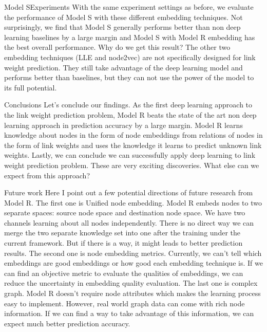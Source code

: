 \documentclass{beamer}
\begin{document}
\begin{frame}{Model S}{Experiments}
With the same experiment settings as before, we evaluate the performance of Model S with these different embedding techniques. Not surprisingly, we find that Model S generally performs better than non deep learning baselines by a large margin and Model S with Model R embedding has the best overall performance. Why do we get this result? The other two embedding techniques (LLE and node2vec) are not specifically designed for link weight prediction. They still take advantage of the deep learning model and performs better than baselines, but they can not use the power of the model to its full potential.
\end{frame}

\begin{frame}{Conclusions}
Let's conclude our findings. As the first deep learning approach to the link weight prediction problem, Model R beats the state of the art non deep learning approach in prediction accuracy by a large margin. Model R learns knowledge about nodes in the form of node embeddings from relations of nodes in the form of link weights and uses the knowledge it learns to predict unknown link weights. Lastly, we can conclude we can successfully apply deep learning to link weight prediction problem. These are very exciting discoveries. What else can we expect from this approach?
\end{frame}

\begin{frame}{Future work}
Here I point out a few potential directions of future research from Model R. The first one is Unified node embedding. Model R embeds nodes to two separate spaces: source node space and destination node space. We have two channels learning about all nodes independently. There is no direct way we can merge the two separate knowledge set into one after the training under the current framework. But if there is a way, it might leads to better prediction results. The second one is node embedding metrics. Currently, we can't tell which embeddings are good embeddings or how good each embedding technique is. If we can find an objective metric to evaluate the qualities of embeddings, we can reduce the uncertainty in embedding quality evaluation. The last one is complex graph. Model R doesn't require node attributes which makes the learning process easy to implement. However, real world graph data can come with rich node information. If we can find a way to take advantage of this information, we can expect much better prediction accuracy.
\end{frame}
\end{document}

